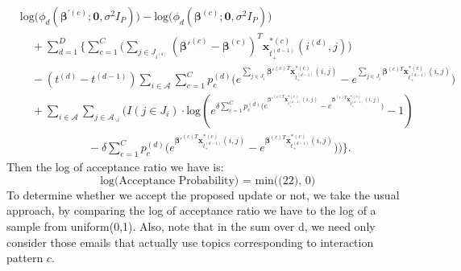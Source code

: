 \documentclass[a4paper]{article}
\begin{document}
  \begin{equation}
  \begin{aligned} 
  &\mbox{log}\Big(\phi_d(\boldsymbol{\beta}^{\prime(c)};\mathbf{0}, \sigma^2I_P)\Big)-\mbox{log}\Big(\phi_d(\boldsymbol{\beta}^{(c)};\mathbf{0}, \sigma^2I_P)\Big)\\&\quad+  \sum_{d=1}^D\Big\{\sum\limits_{c=1}^C\Big(\sum\limits_{j \in{J_{i^{(d)}}}}{(\boldsymbol{\beta}'^{(c)}-\boldsymbol{\beta}^{(c)})}^T\boldsymbol{x}^{*(c)}_{t^{(d-1)}_+}(i^{(d)}, j)\Big)\\&\quad-(t^{(d)}-t^{(d-1)})\sum\limits_{i \in \mathcal{A}}\sum\limits_{c=1}^Cp_c^{(d)}\Big(e^{\sum\limits_{j \in{J_i}} \boldsymbol{\beta}'^{(c)T}\boldsymbol{x}^{*(c)}_{t^{(d-1)}_+}(i, j)}-e^{\sum\limits_{j \in{J_i}} \boldsymbol{\beta}^{(c)T}\boldsymbol{x}^{*(c)}_{t^{(d-1)}_+}(i, j)}\Big)\\&\quad+\sum\limits_{i\in \mathcal{A}}\sum\limits_{j \in \mathcal{A}_{\backslash i }}\Big(I(j \in J_i)\cdot\mbox{log}(e^{\delta\sum\limits_{c=1}^Cp_c^{(d)}\Big( e^{\boldsymbol{\beta}'^{(c)T}\boldsymbol{x}^{*(c)}_{t^{(d-1)}_+}(i, j)}-e^{\boldsymbol{\beta}^{(c)T}\boldsymbol{x}^{*(c)}_{t^{(d-1)}_+}(i, j)}\Big)}-1)\\&\quad\quad\quad\quad\quad\quad-\delta\sum\limits_{c=1}^Cp_c^{(d)} \Big(e^{\boldsymbol{\beta}'^{(c)T}\boldsymbol{x}^{*(c)}_{t^{(d-1)}_+}(i, j)}-e^{\boldsymbol{\beta}^{(c)T}\boldsymbol{x}^{*(c)}_{t^{(d-1)}_+}(i, j)}\Big)\Big)\Big\}.
  \end{aligned}
  \end{equation}
 Then the log of acceptance ratio we have is:
 \begin{equation}
 \mbox{log(Acceptance Probability) = min((22), 0) }
 \end{equation}
 To determine whether we accept the proposed update or not, we take the usual approach, by comparing the log of acceptance ratio we have to the log of a sample from uniform(0,1). Also, note that in the sum over d, we need only consider those emails that actually use topics corresponding to interaction pattern $c$.  
\end{document}
